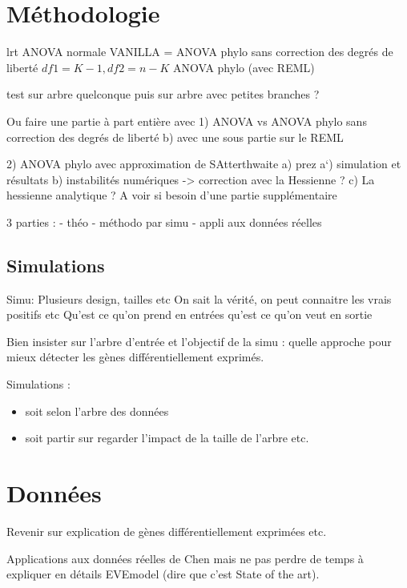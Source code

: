 \documentclass[a4paper, 12pt]{article}\usepackage[]{graphicx}\usepackage[]{xcolor}
\begin{document}
\section{Méthodologie}
\label{chap:metho}
lrt 
ANOVA normale 
VANILLA = ANOVA phylo sans correction des degrés de liberté $df1 = K - 1, df2 = n-K$
ANOVA phylo (avec REML)

test sur arbre quelconque
puis sur arbre avec petites branches ? 

Ou faire une partie à part entière avec 
1) ANOVA vs ANOVA phylo sans correction des degrés de liberté
 b) avec une sous partie sur le REML

2) ANOVA phylo avec approximation de SAtterthwaite 
 a) prez
 a`) simulation et résultats 
 b) instabilités numériques -> correction avec la Hessienne ? 
 c) La hessienne analytique ? A voir si besoin d'une partie supplémentaire
 

3 parties :
- théo
- méthodo par simu
- appli aux données réelles



\subsection{Simulations}

Simu: Plusieurs design, tailles etc
On sait la vérité, on peut connaitre les vrais positifs etc 
Qu'est ce qu'on prend en entrées qu'est ce qu'on veut en sortie



Bien insister sur l'arbre d'entrée et l'objectif de la simu : quelle approche pour mieux détecter les gènes différentiellement exprimés.

Simulations :
\begin{itemize}
    \item soit selon l'arbre des données
    \item soit partir sur regarder l'impact de la taille de l'arbre etc.
\end{itemize}

\section{Données}
\label{sec:data}


Revenir sur explication de gènes différentiellement exprimées etc.

Applications aux données réelles de Chen mais ne pas perdre de temps à expliquer en détails EVEmodel (dire que c'est State of the art).
\end{document}
